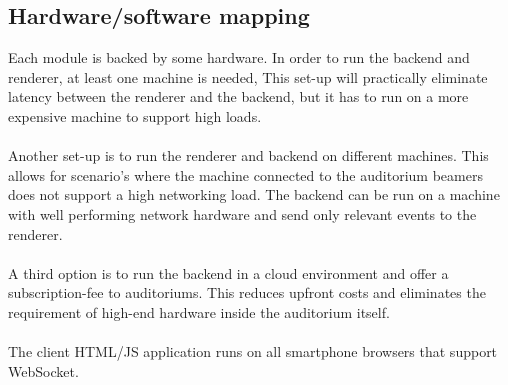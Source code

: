 \documentclass[11pt,a4paper]{article}
\begin{document}
\subsection{Hardware/software mapping}
Each module is backed by some hardware. In order to run the backend and renderer, at least one machine is needed, This set-up will practically eliminate latency between the renderer and the backend, but it has to run on a more expensive machine to support high loads.\\
\\
Another set-up is to run the renderer and backend on different machines. This allows for scenario's where the machine connected to the auditorium beamers does not support a high networking load. The backend can be run on a machine with well performing network hardware and send only relevant events to the renderer.\\
\\
A third option is to run the backend in a cloud environment and offer a subscription-fee to auditoriums. This reduces upfront costs and eliminates the requirement of high-end hardware inside the auditorium itself.\\
\\
The client HTML/JS application runs on all smartphone browsers that support WebSocket. 
\end{document}
